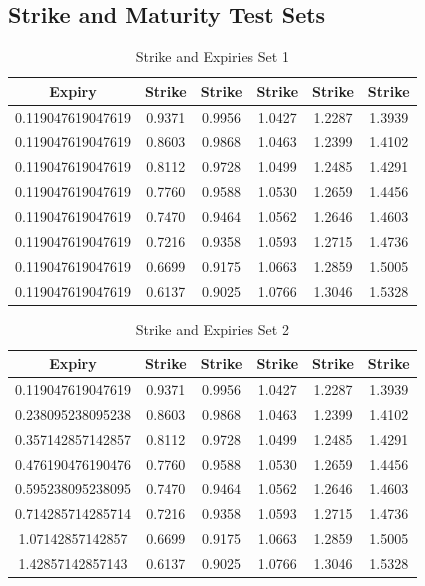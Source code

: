 \documentclass[12,twoside]{mammeTFM}
\theoremstyle{definition}
\theoremstyle{remark}
\begin{document}
\subsection{Strike and Maturity Test Sets}\label{app:strikes}

\begin{table}[!h]
\begin{center}
 \begin{tabular}{|c | c | c | c | c | c |} 
 \hline
 Expiry & Strike & Strike & Strike & Strike & Strike \\ [0.5ex] 
 \hline
 0.119047619047619 & 0.9371 & 0.9956 & 1.0427 & 1.2287 & 1.3939 \\
\hline
0.119047619047619 & 0.8603 & 0.9868 & 1.0463 & 1.2399 & 1.4102 \\
\hline
0.119047619047619 & 0.8112 & 0.9728 & 1.0499 & 1.2485 & 1.4291 \\
\hline
0.119047619047619 & 0.7760 & 0.9588 & 1.0530 & 1.2659 & 1.4456 \\
\hline
0.119047619047619 & 0.7470 & 0.9464 & 1.0562 & 1.2646 & 1.4603 \\
\hline
0.119047619047619 & 0.7216 & 0.9358 & 1.0593 & 1.2715 & 1.4736 \\
\hline
0.119047619047619 & 0.6699 & 0.9175 & 1.0663 & 1.2859 & 1.5005 \\
\hline
0.119047619047619 & 0.6137 & 0.9025 & 1.0766 & 1.3046 & 1.5328 \\
 \hline
\end{tabular}
\caption{Strike and Expiries Set 1}\label{table:set1}
\end{center}
\end{table}

\begin{table}[!h]
\begin{center}
 \begin{tabular}{|c | c | c | c | c | c |} 
 \hline
 Expiry & Strike & Strike & Strike & Strike & Strike \\ [0.5ex] 
 \hline
 0.119047619047619 & 0.9371 & 0.9956 & 1.0427 & 1.2287 & 1.3939 \\
\hline
0.238095238095238 & 0.8603 & 0.9868 & 1.0463 & 1.2399 & 1.4102 \\
\hline
0.357142857142857 & 0.8112 & 0.9728 & 1.0499 & 1.2485 & 1.4291 \\
\hline
0.476190476190476 & 0.7760 & 0.9588 & 1.0530 & 1.2659 & 1.4456 \\
\hline
0.595238095238095 & 0.7470 & 0.9464 & 1.0562 & 1.2646 & 1.4603 \\
\hline
0.714285714285714 & 0.7216 & 0.9358 & 1.0593 & 1.2715 & 1.4736 \\
\hline
1.07142857142857 & 0.6699 & 0.9175 & 1.0663 & 1.2859 & 1.5005 \\
\hline
1.42857142857143 & 0.6137 & 0.9025 & 1.0766 & 1.3046 & 1.5328 \\
 \hline
\end{tabular}
\caption{Strike and Expiries Set 2}\label{table:set2}
\end{center}
\end{table}
\end{document}
